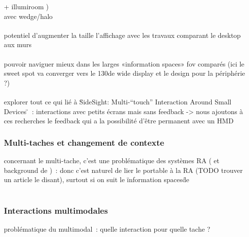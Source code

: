 + illumiroom \cite{JonesBenkoOfekEtAl2013}) \\
avec wedge/halo \cite{BaudischRosenholtz2003} \cite{GustafsonBaudischGutwinEtAl2008} \cite{BurigatChittaro2011} \\

\paragraph*{}
potentiel d'augmenter la taille l'affichage avec les travaux comparant le desktop aux murs \cite{LiuChapuisBeaudouin-LafonEtAl2014} \cite{ShuppBallYostEtAl2006} \cite{TanGergleScupelliEtAl2003}

\paragraph*{}
pouvoir naviguer mieux dans les larges «information spaces» fov comparés \cite{RaedleJetterMuellerEtAl2014} (ici le sweet spot va converger vers le 130\textdegree de wide display et le design pour la périphérie ?)

\paragraph*{}
explorer tout ce qui lié à \"SideSight: Multi-“touch” Interaction Around Small Devices \"~: interactions avec petits écrans mais sans feedback -> nous ajoutons à ces recherches le feedback qui a la possibilité d'être permanent avec un HMD


\subsubsection*{Multi-taches et changement de contexte}
concernant le multi-tache, c'est une problématique des systèmes RA (\cite{SchmalstiegFuhrmannHesinaEtAl2002} et background de \cite{EnsFinneganIrani2014})~: donc c'est naturel de lier le portable à la RA (TODO trouver un article le disant), surtout si on suit le \"information spaces\" de \cite{EnsHincapie-RamosIrani2014} \\
\cite{TanCzerwinski2003} \\
\cite{RashidNacentaQuigley2012a}


\subsubsection*{Interactions multimodales}
problématique du multimodal~: quelle interaction pour quelle tache ?

